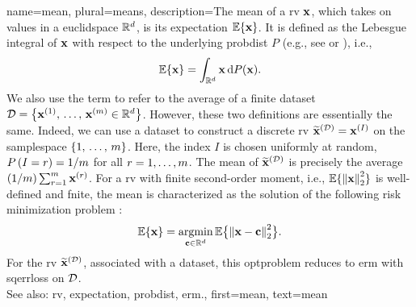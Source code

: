 {name={mean}, plural={means},
	description={The  mean of a \gls{rv} ${\bf x}$, which takes 
 		on values in a \gls{euclidspace} $\mathbb{R}^{d}$, is its 
 		\gls{expectation} $\mathbb{E}\{{\bf x}\}$. It is defined as the Lebesgue 
 		integral of ${\bf x}$ with respect to the underlying \gls{probdist} $P$ (e.g., 
		see \cite{RudinBookPrinciplesMatheAnalysis} or \cite{BillingsleyProbMeasure}), i.e.,
		\[
			\mathbb{E}\{{\bf x}\} = \int_{\mathbb{R}^{d}} {\bf x} \, \mathrm{d}P({\bf x}).
		\]  
		We also use the term to refer to the average of a finite \gls{dataset}
		$\mathcal{D} = \left\{ {\bf x}^{(1)}, \,\ldots, \,{\bf x}^{(m)} \in \mathbb{R}^{d}\right\}$. 
		However, these two definitions are essentially the same. Indeed, we can use 
		a \gls{dataset} to construct a discrete \gls{rv} $\widetilde{{\bf x}}^{(\mathcal{D})}={\bf x}^{(I)}$ on 
		the \gls{samplespace} $\{1, \,\ldots, \,m\}$. Here, the index $I$ is 
		chosen uniformly at random, $P\left(I=r\right)=1/m$ for all 
		$r=1,\ldots,m$. The mean of $\widetilde{{\bf x}}^{(\mathcal{D})}$ is 
		precisely the average $({1}/{m}) \sum_{r=1}^{m} {\bf x}^{(r)}$.
		For a \gls{rv} with finite second-order moment, i.e., 
		$\expect\{ \normgeneric{\featurevec}{2}^{2} \}$ is well-defined and fnite, 
		the mean is characterized as the solution of the 
		following \gls{risk} minimization problem \cite{BertsekasProb}:
		\[
			\expect\{\featurevec\} = \argmin_{\vc \in \mathbb{R}^{\nrfeatures}} 
			\expect \big\{\normgeneric{\featurevec - \vc}{2}^{2}\big \}.
		\]
		For the \gls{rv} $\widetilde{{\bf x}}^{(\mathcal{D})}$, associated with a \gls{dataset}, 
		this \gls{optproblem} reduces to \gls{erm} with \gls{sqerrloss} on $\mathcal{D}$. 
		\\ 
		See also: \gls{rv}, \gls{expectation}, \gls{probdist}, \gls{erm}.}, 
	first={mean}, 
	text={mean} 
}

